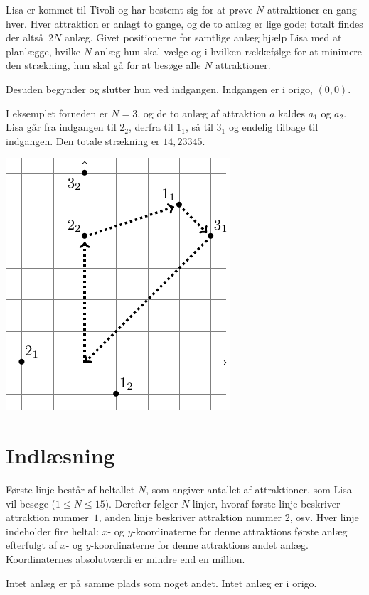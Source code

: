 
Lisa er kommet til Tivoli og har bestemt sig for at prøve $N$ attraktioner en gang hver.
Hver attraktion er anlagt to gange, og de to anlæg er lige gode; totalt findes der altså $2N$ anlæg.
Givet positionerne for samtlige anlæg hjælp Lisa med at planlægge, hvilke $N$ anlæg hun skal vælge og i hvilken rækkefølge for at minimere den strækning, hun skal gå for at besøge alle $N$ attraktioner.

Desuden begynder og slutter hun ved indgangen.
Indgangen er i origo, $(0,0)$.

I eksemplet forneden er $N=3$, og de to anlæg af attraktion $a$ kaldes $a_1$ og $a_2$.
Lisa går fra indgangen til $2_2$, derfra til $1_1$, så til $3_1$ og endelig tilbage til indgangen.
Den totale strækning er $14{,}23345$.

\bigskip
\includegraphics{img/tivoli-sample-img.pdf}

\section*{Indlæsning}
Første linje består af heltallet $N$, som angiver antallet af attraktioner, som Lisa vil besøge ($1 \le N \le 15$).
Derefter følger $N$ linjer, hvoraf første linje beskriver attraktion nummer~$1$, anden linje beskriver attraktion nummer $2$, osv.
Hver linje indeholder fire heltal: $x$- og $y$-koordinaterne for denne attraktions første anlæg efterfulgt af $x$- og $y$-koordinaterne for denne attraktions andet anlæg.
Koordinaternes absolutværdi er mindre end en million.

Intet anlæg er på samme plads som noget andet.
Intet anlæg er i origo.

